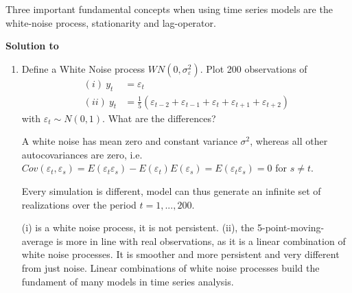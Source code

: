 Three important fundamental concepts when using time series models are the white-noise process, stationarity and lag-operator.
\begin{solution}\textbf{Solution to }
\end{solution}

\begin{enumerate}
    \item Define a White Noise process $WN(0,\sigma_\varepsilon^2)$. Plot 200 observations of
          \begin{align*} (i)~y_t & =\varepsilon_t \\ (ii)~y_t &= \frac{1}{5}(\varepsilon_{t-2}+\varepsilon_{t-1}+\varepsilon_{t}+\varepsilon_{t+1}+\varepsilon_{t+2})
          \end{align*} with $\varepsilon_{t} \sim N(0,1)$. What are the differences?
          \begin{solution}
              A white noise has mean zero and constant variance $\sigma^2$, whereas all other autocovariances are zero, i.e. $Cov(\varepsilon_{t},\varepsilon_s) = E(\varepsilon_t \varepsilon_s) - E(\varepsilon_t)E(\varepsilon_s) = E(\varepsilon_t \varepsilon_s) = 0$ for $s \neq t$.
              
              Every simulation is different, model can thus generate an infinite set of realizations over the period $t=1,...,200$.

              (i) is a white noise process, it is not persistent.
              (ii), the 5-point-moving-average is more in line with real observations, as it is a linear combination of white noise processes. It is smoother and more persistent and very different from just noise. Linear combinations of white noise processes build the fundament of many models in time series analysis.
          \end{solution}


\end{enumerate}
